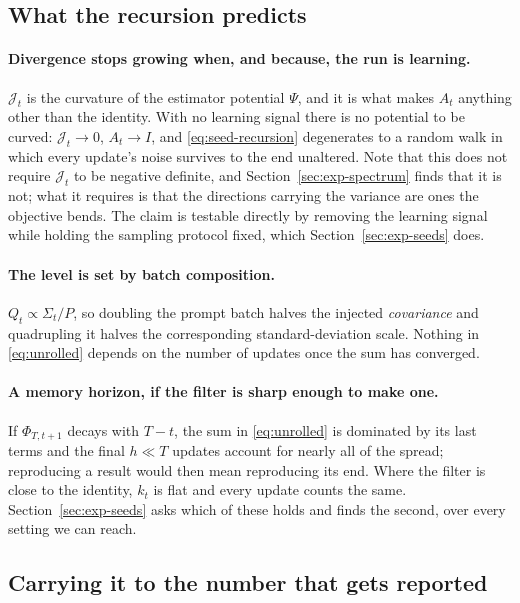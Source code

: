 \subsection{What the recursion predicts}

\paragraph{Divergence stops growing when, and because, the run is learning.} $\mathcal{J}_t$ is
the curvature of the estimator potential $\Psi$, and it is what makes $A_t$ anything other than the
identity. With no learning signal there is no potential to be curved: $\mathcal{J}_t \to 0$,
$A_t \to I$, and \eqref{eq:seed-recursion} degenerates to a random walk in which every update's
noise survives to the end unaltered. Note that this does not require $\mathcal{J}_t$ to be negative
definite, and Section~\ref{sec:exp-spectrum} finds that it is not; what it requires is that the
directions carrying the variance are ones the objective bends. The claim is testable directly by
removing the learning signal while holding the sampling protocol fixed, which
Section~\ref{sec:exp-seeds} does.

\paragraph{The level is set by batch composition.} $Q_t \propto \Sigma_t/P$, so doubling the
prompt batch halves the injected \emph{covariance} and quadrupling it halves the corresponding
standard-deviation scale. Nothing in \eqref{eq:unrolled} depends on the number of updates once the
sum has converged.

\paragraph{A memory horizon, if the filter is sharp enough to make one.} If $\Phi_{T,t+1}$
decays with $T - t$, the sum in \eqref{eq:unrolled} is dominated by its last terms and the final
$h \ll T$ updates account for nearly all of the spread; reproducing a result would then mean
reproducing its end. Where the filter is close to the identity, $k_t$ is flat and every update
counts the same.
Section~\ref{sec:exp-seeds} asks which of these holds and finds the second, over every setting we
can reach.

\subsection{Carrying it to the number that gets reported}
\label{sec:metric}

